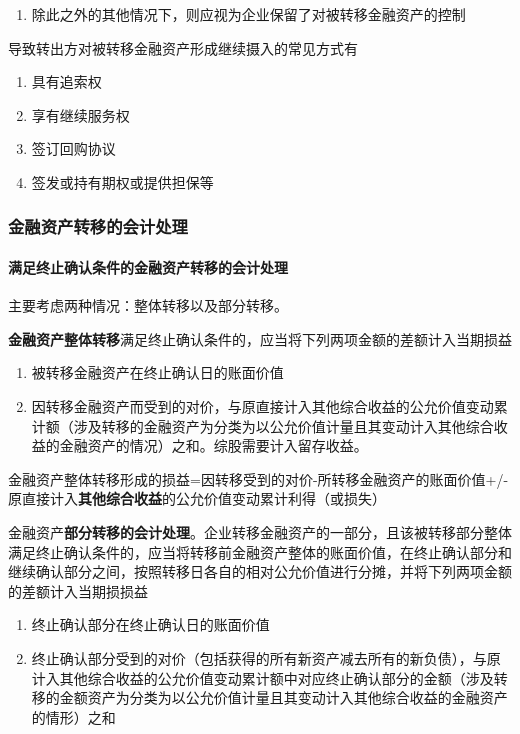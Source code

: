 \documentclass[UTF8,12pt]{ctexart}
\numberwithin{equation}{section} %
\numberwithin{figure}{section}
\numberwithin{table}{section}
\begin{document}
\begin{enumerate}
\begin{enumerate}
			\item 除此之外的其他情况下，则应视为企业保留了对被转移金融资产的控制
		\end{enumerate}
	
		导致转出方对被转移金融资产形成继续摄入的常见方式有
		\begin{enumerate}
			\item 具有追索权
			
			\item 享有继续服务权
			
			\item 签订回购协议
			
			\item 签发或持有期权或提供担保等
		\end{enumerate}
	\end{enumerate}
	
	\subsubsection{金融资产转移的会计处理}
	\paragraph{满足终止确认条件的金融资产转移的会计处理} 主要考虑两种情况：整体转移以及部分转移。
	
	\textbf{金融资产整体转移}满足终止确认条件的，应当将下列两项金额的差额计入当期损益
	\begin{enumerate}
		\item 被转移金融资产在终止确认日的账面价值
		
		\item 因转移金融资产而受到的对价，与原直接计入其他综合收益的公允价值变动累计额（涉及转移的金融资产为分类为以公允价值计量且其变动计入其他综合收益的金融资产的情况）之和。综股需要计入留存收益。
	\end{enumerate}

	金融资产整体转移形成的损益=因转移受到的对价-所转移金融资产的账面价值+/-原直接计入\textbf{其他综合收益}的公允价值变动累计利得（或损失）
	
	
	金融资产\textbf{部分转移的会计处理}。企业转移金融资产的一部分，且该被转移部分整体满足终止确认条件的，应当将转移前金融资产整体的账面价值，在终止确认部分和继续确认部分之间，按照转移日各自的相对公允价值进行分摊，并将下列两项金额的差额计入当期损损益
	\begin{enumerate}
		\item 终止确认部分在终止确认日的账面价值
		
		\item 终止确认部分受到的对价（包括获得的所有新资产减去所有的新负债），与原计入其他综合收益的公允价值变动累计额中对应终止确认部分的金额（涉及转移的金额资产为分类为以公允价值计量且其变动计入其他综合收益的金融资产的情形）之和
	\end{enumerate}
\end{document}
